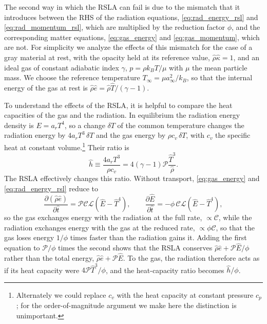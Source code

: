 \documentclass[preprint,12pt,authoryear]{elsarticle}
\newcommand{\hatt}{\hat{t}}
\newcommand{\hrho}{\hat{\rho}}
\newcommand{\he}{\hat{e}}
\newcommand{\hE}{\hat{E}}
\newcommand{\hT}{\hat{T}}
\newcommand{\calC}{\mathcal{C}}
\newcommand{\calP}{\mathcal{P}}
\newcommand{\calL}{\mathcal{L}}
\begin{document}
The second way in which the RSLA can fail is due to the mismatch that it introduces between the RHS of the radiation equations, \autoref{eq:rad_energy_rsl} and \autoref{eq:rad_momentum_rsl}, which are multiplied by the reduction factor $\phi$, and the corresponding matter equations, \autoref{eq:gas_energy} and \autoref{eq:gas_momentum}, which are not. For simplicity we analyze the effects of this mismatch for the case of a gray material at rest, with the opacity held at its reference value, $\hrho\hat{\kappa} = 1$, and an ideal gas of constant adiabatic index $\gamma$, $p = \rho k_B T/\mu$ with $\mu$ the mean particle mass. We choose the reference temperature $T_\infty = \mu a_\infty^2/k_B$, so that the internal energy of the gas at rest is $\hrho\he = \hrho\hT/(\gamma - 1)$.

To understand the effects of the RSLA, it is helpful to compare the heat capacities of the gas and the radiation. In equilibrium the radiation energy density is $E = a_r T^4$, so a change $\delta T$ of the common temperature changes the radiation energy by $4 a_r T^3\,\delta T$ and the gas energy by $\rho c_v\,\delta T$, with $c_v$ the specific heat at constant volume.\footnote{Alternately we could replace $c_v$ with the heat capacity at constant pressure $c_p$; for the order-of-magnitude argument we make here the distinction is unimportant.} Their ratio is
\begin{equation}
    \hat{h} \equiv \frac{4 a_r T^3}{\rho c_v} = 4(\gamma-1)\calP \frac{\hT^3}{\hrho}.
    \label{eq:h_ratio}
\end{equation}
The RSLA effectively changes this ratio. Without transport, \autoref{eq:gas_energy} and  \autoref{eq:rad_energy_rsl} reduce to
\begin{equation}
    \frac{\partial(\hrho\he)}{\partial\hatt} = \calP\calC\calL\left(\hE - \hT^4\right),
    \qquad
    \frac{\partial\hE}{\partial\hatt} = -\phi\,\calC\calL\left(\hE - \hT^4\right),
    \label{eq:rsla_exchange}
\end{equation}
so the gas exchanges energy with the radiation at the full rate, $\propto \calC$, while the radiation exchanges energy with the gas at the reduced rate, $\propto \phi\calC$, so that the gas loses energy $1/\phi$ times faster than the radiation gains it. Adding the first equation to $\calP/\phi$ times the second shows that the RSLA conserves $\hrho\he + \calP\hE/\phi$ rather than the total energy, $\hrho\he + \calP\hE$. To the gas, the radiation therefore acts as if its heat capacity were $4\calP\hT^3/\phi$, and the heat-capacity ratio becomes $\hat{h}/\phi$.
\end{document}
